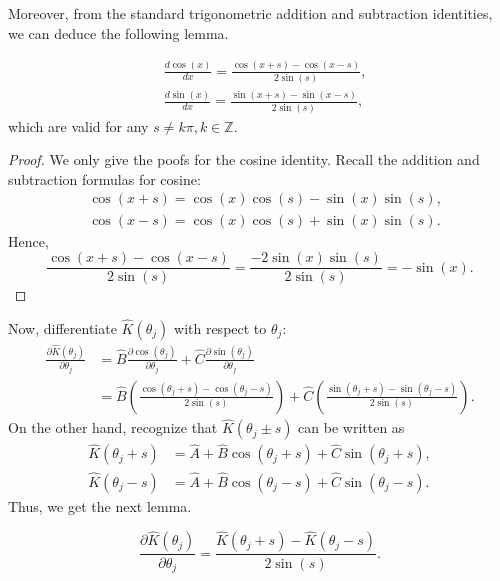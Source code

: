 Moreover, from the standard trigonometric addition and subtraction identities, we can deduce the following lemma.

\begin{lemma}
\begin{align}
& \frac{d \cos (x)}{d x}=\frac{\cos (x+s)-\cos (x-s)}{2 \sin (s)}, \\
& \frac{d \sin (x)}{d x}=\frac{\sin (x+s)-\sin (x-s)}{2 \sin (s)},
\end{align}
which are valid for any $s \neq k \pi, k \in \mathbb{Z}$.
\end{lemma}

\begin{proof}
    We only give the poofs for the cosine identity. Recall the addition and subtraction formulas for cosine:
\begin{align}
& \cos (x+s)=\cos (x) \cos (s)-\sin (x) \sin (s), \\
& \cos (x-s)=\cos (x) \cos (s)+\sin (x) \sin (s).
\end{align}
Hence,
\begin{equation}
    \frac{\cos (x+s)-\cos (x-s)}{2 \sin (s)}=\frac{-2 \sin (x) \sin (s)}{2 \sin (s)}=-\sin (x).
\end{equation}
\end{proof}

Now, differentiate $\hat{K}\left(\theta_j\right)$ with respect to $\theta_j$:
\begin{align}
\frac{\partial \hat{K}\left(\theta_j\right)}{\partial \theta_j}
&=\hat{B}\frac{\partial \cos \left(\theta_j\right)}{\partial \theta_j} +\hat{C}\frac{\partial \sin \left(\theta_j\right)}{\partial \theta_j} \\
&=\hat{B}\left(\frac{\cos \left(\theta_j+s\right)-\cos \left(\theta_j-s\right)}{2 \sin (s)}\right)+\hat{C}\left(\frac{\sin \left(\theta_j+s\right)-\sin \left(\theta_j-s\right)}{2 \sin (s)}\right).
\end{align}
On the other hand, recognize that $\hat{K}\left(\theta_j \pm s\right)$ can be written as
\begin{align}
\hat{K}\left(\theta_j+s\right) & =\hat{A}+\hat{B} \cos \left(\theta_j+s\right)+\hat{C} \sin \left(\theta_j+s\right),\\
\hat{K}\left(\theta_j-s\right) & =\hat{A}+\hat{B} \cos \left(\theta_j-s\right)+\hat{C} \sin \left(\theta_j-s\right).
\end{align}
Thus, we get the next lemma.

\begin{lemma}
\begin{equation}
    \frac{\partial \hat{K}\left(\theta_j\right)}{\partial \theta_j}=\frac{\hat{K}\left(\theta_j+s\right)-\hat{K}\left(\theta_j-s\right)}{2 \sin (s)}.
\end{equation}
\end{lemma}

